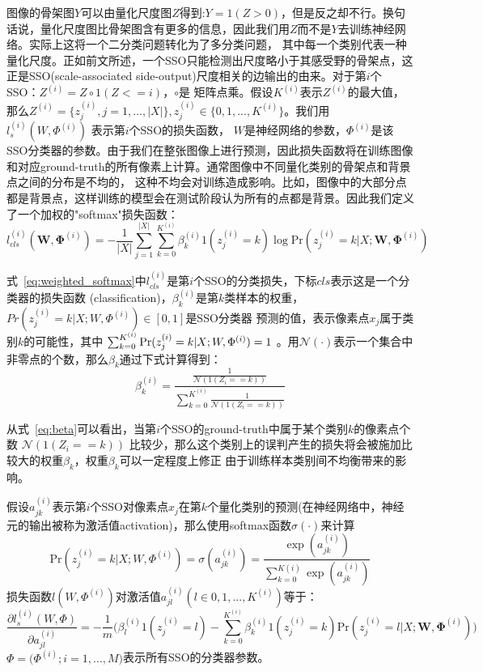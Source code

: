 \documentclass[UTF8]{ctexart}
\numberwithin{equation}{section} %
\numberwithin{table}{section} %
\begin{document}
图像的骨架图$Y$可以由量化尺度图$Z$得到:$Y=1(Z>0)$，但是反之却不行。换句话说，量化尺度图比骨架图含有更多的信息，因此我们用$Z$而不是$Y$去训练神经网络。实际上这将一个二分类问题转化为了多分类问题，
其中每一个类别代表一种量化尺度。正如前文所述，一个SSO只能检测出尺度略小于其感受野的骨架点，这正是SSO(scale-associated side-output)尺度相关的边输出的由来。对于第$i$个SSO：$Z^{(i)} = Z \circ 1(Z<=i)$，$\circ$是
矩阵点乘。假设$K^{(i)}$表示$Z^{(i)}$的最大值，那么$Z^{(i)} = \big\{z^{(i)}_j, j=1,...,|X|\big\},z^{(i)}_j \in \big\{0,1,...,K^{(i)}\big\}$。我们用 $l^{(i)}_s(W, \Phi^{(i)})$ 表示第$i$个SSO的损失函数，
$W$是神经网络的参数，$\Phi^{(i)}$是该SSO分类器的参数。由于我们在整张图像上进行预测，因此损失函数将在训练图像和对应ground-truth的所有像素上计算。通常图像中不同量化类别的骨架点和背景点之间的分布是不均的，
这种不均会对训练造成影响。比如，图像中的大部分点都是背景点，这样训练的模型会在测试阶段认为所有的点都是背景。因此我们定义了一个加权的"softmax"损失函数：
\begin{equation}
l^{(i)}_{cls}(\mathbf{W}, \mathbf{\Phi}^{(i)}) = - \frac{1}{|X|} \sum_{j=1}^{|X|} \sum_{k=0}^{K^{(i)}}\beta^{(i)}_k1(z^{(i)}_j=k)\log \text{Pr}(z^{(i)}_j=k|X;\mathbf{W},\mathbf{\Phi}^{(i)})
\label{eq:weighted_softmax}
\end{equation}

式~\ref{eq:weighted_softmax}中$l^{(i)}_{cls}$是第$i$个SSO的分类损失，下标$cls$表示这是一个分类器的损失函数 (classification)，$\beta^{(i)}_k$是第$k$类样本的权重，$Pr(z^{(i)}_j=k|X;W,\Phi^{(i)}) \in [0,1]$是SSO分类器
预测的值，表示像素点$x_j$属于类别$k$的可能性，其中 $\sum_{k=0}^{K^{(i)}}\text{Pr}(z^{(i)}_j=k|X;W,\\ \Phi^{(i)}) = 1$ 。用$\mathcal{N}(\cdot)$表示一个集合中非零点的个数，那么$\beta_k$通过下式计算得到：
\begin{equation}
\beta^{(i)}_k = \frac{\frac{1}{\mathcal{N}(1(Z_i==k))}}{\sum_{k=0}^{K^{(i)}}\frac{1}{\mathcal{N}(1(Z_i==k))}}
\label{eq:beta}
\end{equation}

从式~\ref{eq:beta}可以看出，当第$i$个SSO的ground-truth中属于某个类别$k$的像素点个数 $\mathcal{N}(1(Z_i==k))$ 比较少，那么这个类别上的误判产生的损失将会被施加比较大的权重$\beta_k$，权重$\beta_k$可以一定程度上修正
由于训练样本类别间不均衡带来的影响。

假设$a^{(i)}_{jk}$表示第$i$个SSO对像素点$x_j$在第$k$个量化类别的预测(在神经网络中，神经元的输出被称为激活值activation)，那么使用softmax函数$\sigma(\cdot)$来计算
\begin{equation}
\text{Pr}(z^{(i)}_j=k|X;W,\Phi^{(i)}) = \sigma(a^{(i)}_{jk})=\frac{\exp(a^{(i)}_{jk})}{\sum_{k=0}^{K{(i)}} \exp(a^{(i)}_{jk})}
\end{equation}
损失函数$l(W,\Phi^{(i)})$对激活值$a^{(i)}_{jl}(l \in {0,1,...,K^{(i)}})$等于：
\begin{equation}
\frac{\partial l^{(i)}_s(W,\Phi)}{\partial a^{(i)}_{jl}} = -\frac{1}{m}\bigg(\beta^{(i)}_l1(z^{(i)}_j=l)-\sum_{k=0}^{K^{(i)}}\beta^{(i)}_k1(z^{(i)}_j=k)\text{Pr}(z^{(i)}_j=l|X;\mathbf{W},\mathbf{\Phi}^{(i)})\bigg)
\label{eq:partial}
\end{equation}
$\Phi=\big(\Phi^{(i)};i=1,...,M\big)$表示所有SSO的分类器参数。
\end{document}
